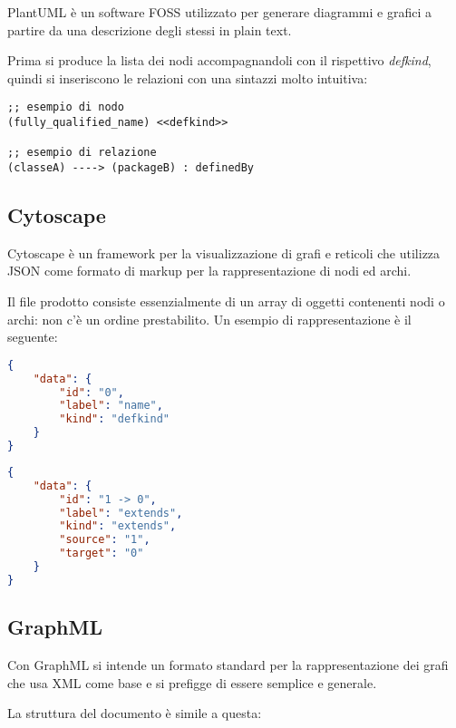 PlantUML \`e un software FOSS utilizzato per generare diagrammi e grafici a partire da una descrizione degli stessi in plain text.

Prima si produce la lista dei nodi accompagnandoli con il rispettivo \emph{defkind}, quindi si inseriscono le relazioni con una sintazzi molto intuitiva:

\begin{lstlisting}
;; esempio di nodo
(fully_qualified_name) <<defkind>>

;; esempio di relazione
(classeA) ----> (packageB) : definedBy
\end{lstlisting}

\subsection{Cytoscape}

Cytoscape \`e un framework per la visualizzazione di grafi e reticoli che utilizza JSON come formato di markup per la rappresentazione di nodi ed archi.

Il file prodotto consiste essenzialmente di un array di oggetti contenenti nodi o archi: non c'\`e un ordine prestabilito. Un esempio di rappresentazione \`e il seguente:

\begin{lstlisting}[language=JSON, caption=esempio di nodo]
{
    "data": {
        "id": "0",
        "label": "name",
        "kind": "defkind"
    }
}
\end{lstlisting}

\begin{lstlisting}[language=JSON, caption=esempio di arco]
{
    "data": {
        "id": "1 -> 0",
        "label": "extends",
        "kind": "extends",
        "source": "1",
        "target": "0"
    }
}
\end{lstlisting}

\subsection{GraphML}

Con GraphML si intende un formato standard per la rappresentazione dei grafi che usa XML come base e si prefigge di essere semplice e generale.

La struttura del documento \`e simile a questa:

